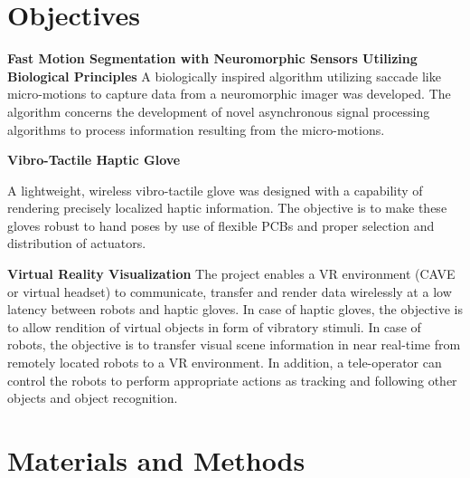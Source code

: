\chapter{Objectives}\label{ch:introduction}



{\bf Fast Motion Segmentation with Neuromorphic Sensors Utilizing Biological Principles}
A biologically inspired algorithm utilizing saccade like micro-motions
to capture data from a neuromorphic imager was developed. The
algorithm concerns the development of novel asynchronous signal
processing algorithms to process information resulting from the
micro-motions.

{\bf Vibro-Tactile Haptic Glove}

 A lightweight, wireless vibro-tactile glove was designed with a capability of rendering precisely localized haptic information.  The objective is to make these gloves robust to hand poses by use of flexible PCBs and proper selection and distribution of actuators.

 {\bf Virtual Reality Visualization}
 The project enables a VR environment (CAVE or virtual headset) to
 communicate, transfer and render data wirelessly at a low latency
 between robots and haptic gloves. In case of haptic gloves, the
 objective is to allow rendition of virtual objects in form of
 vibratory stimuli. In case of robots, the objective is to transfer
 visual scene information in near real-time from remotely located
 robots to a VR environment. In addition, a tele-operator can control
 the robots to perform appropriate actions as tracking and following
 other objects and object recognition.

 \chapter{Materials and Methods}

